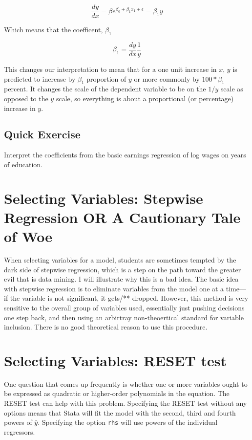 \documentclass[12pt]{article}
\begin{document}
\begin{equation*}
  \frac{dy}{dx}=\beta e^{\beta_0+\beta_1x_1+\epsilon}=\beta_1y
\end{equation*}

Which means that the coefficent, $\beta_1$

\begin{equation*}
  \beta_1=\frac{dy}{dx}\frac{1}{y}
\end{equation*}

This changes our interpretation to mean that for a one unit increase
in $x$, $y$ is predicted to increase by $\beta_1$ proportion of $y$ or
more commonly by $100*\beta_1$ percent. It changes the scale of the
dependent variable to be on the $1/y$ scale as opposed to the $y$
scale, so everything is about a proportional (or percentage) increase
in $y$. 

\subsection{Quick Exercise}
\label{sec:quick-exercise}

Interpret the coefficients from the basic earnings regression of log
wages on years of education. 

\section{Selecting Variables: Stepwise Regression OR A Cautionary Tale of Woe}
\label{sec:select-vari-stepw}

When selecting variables for a model, students are sometimes tempted
by the dark side of stepwise regression, which is a step on the path
toward the greater evil that is data mining. I will illustrate why
this is a bad idea. The basic idea with stepwise regression is to
eliminate variables from the model one at a time---if the variable is
not significant, it gets/** dropped. However, this method is very
sensitive to the overall group of variables used, essentially just
pushing decisions one step back, and then using an arbirtray
non-theoertical standard for variable inclusion. There is no good theoretical
reason to use this procedure. 

\section{Selecting Variables: RESET  test}
\label{sec:select-vari-reset}

One question that comes up frequently is whether one or more variables
ought to be expressed as quadratic or higher-order polynomials in the
equation. The RESET test can help with this problem. Specifying the
RESET test without any options means that Stata will fit the model
with the second, third and fourth powers of $\hat{y}$. Specifying the
option \texttt{rhs} will use powers of the individual regressors.
\end{document}
